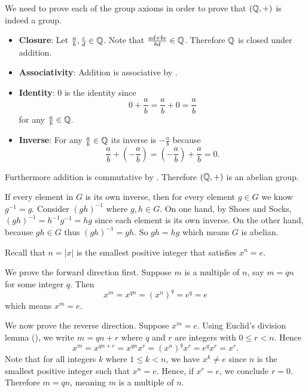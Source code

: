 \begin{questions}
    \item We need to prove each of the group axioms in order to prove that $(\mathbb{Q}, +)$ is indeed a group.
    \begin{itemize}
        \item \textbf{Closure}: Let $\frac ab, \frac cd \in \mathbb{Q}$. Note that $\frac{ad+bc}{bd} \in \mathbb{Q}$. Therefore $\mathbb{Q}$ is closed under addition.

        \item \textbf{Associativity}: Addition is associative by .

        \item \textbf{Identity}: 0 is the identity since
        \[
            0 + \frac ab = \frac ab + 0 = \frac ab
        \]
        for any $\frac ab \in \mathbb{Q}$.

        \item \textbf{Inverse}: For any $\frac ab \in \mathbb{Q}$ its inverse is $-\frac ab$ because
        \[
            \frac ab + \left(-\frac ab\right) = \left(-\frac ab\right) + \frac ab = 0.
        \]
    \end{itemize}
    Furthermore addition is commutative by . Therefore $(\mathbb{Q}, +)$ is an abelian group.

    \item If every element in $G$ is its own inverse, then for every element $g \in G$ we know $g^{-1} = g$. Consider $(gh)^{-1}$ where $g, h \in G$. On one hand, by Shoes and Socks, $(gh)^{-1} = h^{-1}g^{-1} = hg$ since each element is its own inverse. On the other hand, because $gh \in G$ thus $(gh)^{-1} = gh$. So $gh = hg$ which means $G$ is abelian.

    \item Recall that $n = |x|$ is the smallest positive integer that satisfies $x^n = e$.

    We prove the forward direction first. Suppose $m$ is a multiple of $n$, say $m = qn$ for some integer $q$. Then
    \[
        x^m = x^{qn} = \left(x^n\right)^q = e^q = e
    \]
    which means $x^m = e$.

    We now prove the reverse direction. Suppose $x^m = e$. Using Euclid's division lemma (), we write $m = qn + r$ where $q$ and $r$ are integers with $0 \leq r < n$. Hence
    \[
        x^m = x^{qn + r} = x^{qn}x^r = \left(x^n\right)^qx^r = e^qx^r = x^r.
    \]
    Note that for all integers $k$ where $1 \leq k < n$, we have $x^k \neq e$ since $n$ is the smallest positive integer such that $x^n = e$. Hence, if $x^r = e$, we conclude $r = 0$. Therefore $m = qn$, meaning $m$ is a multiple of $n$.


\end{questions}
